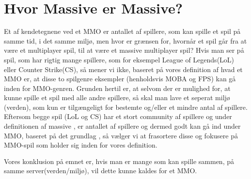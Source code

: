 \cfoot{\page\textbackslash \totalp} %
\setcounter{page}{1}
\chapter{Hvor Massive er Massive?}

Et af kendetegnene ved et MMO er antallet af spillere, som kan spille et spil på samme tid, i det samme miljø, men hvor er grænsen for, hvornår et spil går fra at være et multiplayer spil, til at være et massive multiplayer spil? Hvis man ser på spil, som har rigtig mange spillere, som for eksempel League of Legends(LoL)\cite{LoL} eller Counter Strike(CS)\cite{CS}, så mener vi ikke, baseret på vores definition af hvad et MMO er, at disse to spilgenre eksempler (henholdsvis MOBA og FPS) kan gå inden for MMO-genren. Grunden hertil er, at selvom der er mulighed for, at kunne spille et spil med alle andre spillere, så skal man lave et seperat miljø (verden), som kun er tilgængeligt for bestemte og/eller et mindre antal af spillere.
Eftersom begge spil (LoL og CS) har et stort community af spillere og under definitionen af massive \cite{Statistics}, er antallet af spillere og dermed godt kan gå ind under MMO, baseret på det grundlag , så vælger vi at frasortere disse og fokusere på MMO-spil som holder sig inden for vores definition.

Vores konklusion på emnet er, hvis man er mange som kan spille sammen, på samme server(verden/miljø), vil dette kunne kaldes for et MMO.